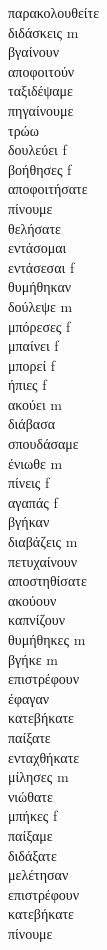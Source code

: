 παρακολουθείτε  \\ 
διδάσκεις m \\ 
βγαίνουν  \\ 
αποφοιτούν  \\ 
ταξιδέψαμε  \\ 
πηγαίνουμε  \\ 
τρώω  \\ 
δουλεύει f \\ 
βοήθησες f \\ 
αποφοιτήσατε  \\ 
πίνουμε  \\ 
θελήσατε  \\ 
εντάσομαι  \\ 
εντάσεσαι f \\ 
θυμήθηκαν  \\ 
δούλεψε m \\ 
μπόρεσες f \\ 
μπαίνει f \\ 
μπορεί f \\ 
ήπιες f \\ 
ακούει m \\ 
διάβασα  \\ 
σπουδάσαμε  \\ 
ένιωθε m \\ 
πίνεις f \\ 
αγαπάς f \\ 
βγήκαν  \\ 
διαβάζεις m \\ 
πετυχαίνουν  \\ 
αποστηθίσατε  \\ 
ακούουν  \\ 
καπνίζουν  \\ 
θυμήθηκες m \\ 
βγήκε m \\ 
επιστρέφουν  \\ 
έφαγαν  \\ 
κατεβήκατε  \\ 
παίξατε  \\ 
ενταχθήκατε  \\ 
μίλησες m \\ 
νιώθατε  \\ 
μπήκες f \\ 
παίξαμε  \\ 
διδάξατε  \\ 
μελέτησαν  \\ 
επιστρέφουν  \\ 
κατεβήκατε  \\ 
πίνουμε  \\ 
